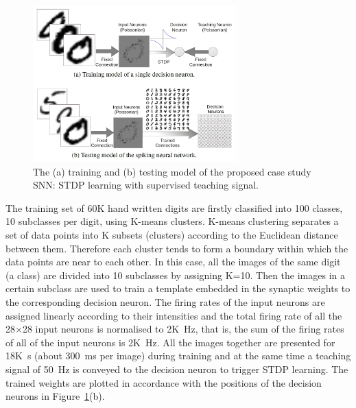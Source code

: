 \begin{figure}[thb!]
	\centering
	\includegraphics[width=0.7\textwidth]{pics_bench/fig6.jpg}
	\caption[The proposed SNN model.]{The (a) training and (b) testing model of the proposed case study SNN: STDP learning with supervised teaching signal.}
	\label{fig:model}
\end{figure} 

The training set of 60K hand written digits are firstly classified into 100 classes, 10 subclasses per digit, using K-means clusters.
K-means clustering separates a set of data points into K subsets (clusters) according to the Euclidean distance between them.
Therefore each cluster tends to form a boundary within which the data points are near to each other.
In this case, all the images of the same digit (a class) are divided into 10 subclasses by assigning K=10.
Then the images in a certain subclass are used to train a template embedded in the synaptic weights to the corresponding decision neuron.
The firing rates of the input neurons are assigned linearly according to their intensities and the total firing rate of all the 28$\times$28 input neurons is normalised to 2K~Hz, that is, the sum of the firing rates of all of the input neurons is 2K~Hz.
All the images together are presented for 18K~s (about 300~ms per image) during training and at the same time a teaching signal of 50~Hz is conveyed to the decision neuron to trigger STDP learning.
The trained weights are plotted in accordance with the positions of the decision neurons in Figure~\ref{fig:model}(b).





